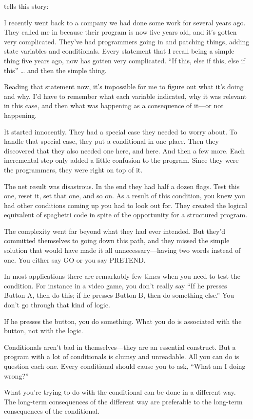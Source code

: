 \begin{interview}
 tells this story:
\begin{tfquot}
I recently went back to a company we had done some work for several years
ago. They called me in because their program is now five years old, and it's
gotten very complicated. They've had programmers going in and patching
things, adding state variables and conditionals. Every statement that I
recall being a simple thing five years ago, now has gotten very complicated.
``If this, else if this, else if this'' \dots{} and then the simple thing.

Reading that statement now, it's impossible for me to figure out what it's
doing and why. I'd have to remember what each variable indicated, why it
was relevant in this case, and then what was happening as a consequence of
it---or not happening.

It started innocently. They had a special case they needed to worry about.
To handle that special case, they put a conditional in one place. Then they
discovered that they also needed one here, and here. And then a few more.
Each incremental step only added a little confusion to the program. Since
they were the programmers, they were right on top of it.

The net result was disastrous. In the end they had half a dozen flags. Test
this one, reset it, set that one, and so on. As a result of this condition, you
knew you had other conditions coming up you had to look out for. They
created the logical equivalent of spaghetti code in spite of the opportunity
for a structured program.

The complexity went far beyond what they had ever intended. But they'd
committed themselves to going down this path, and they missed the simple
solution that would have made it all unnecessary---having two words
instead of one. You either say GO or you say PRETEND.

In most applications there are remarkably few times when you need to test
the condition. For instance in a video game, you don't really say ``If he
presses Button A, then do this; if he presses Button B, then do something
else.'' You don't go through that kind of logic.

If he presses the button, you do something. What you do is associated with
the button, not with the logic.

Conditionals aren't bad in themselves---they are an essential construct. But
a program with a lot of conditionals is clumsy and unreadable. All you can
do is question each one. Every conditional should cause you to ask, ``What
am I doing wrong?''

What you're trying to do with the conditional can be done in a different
way. The long-term consequences of the different way are preferable to the
long-term consequences of the conditional.
\end{tfquot}
\end{interview}

